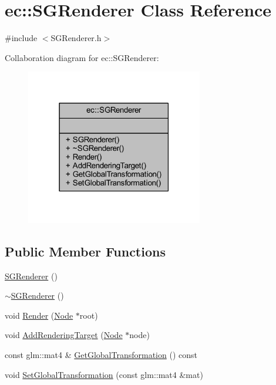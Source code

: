 \hypertarget{classec_1_1_s_g_renderer}{}\section{ec\+:\+:S\+G\+Renderer Class Reference}
\label{classec_1_1_s_g_renderer}


{\ttfamily \#include $<$S\+G\+Renderer.\+h$>$}



Collaboration diagram for ec\+:\+:S\+G\+Renderer\+:
\nopagebreak
\begin{figure}[H]
\begin{center}
\leavevmode
\includegraphics[width=219pt]{classec_1_1_s_g_renderer__coll__graph}
\end{center}
\end{figure}
\subsection*{Public Member Functions}
\begin{DoxyCompactItemize}
\item 
\mbox{\hyperlink{classec_1_1_s_g_renderer_afefd169d09efe9e7439f2003d145310a}{S\+G\+Renderer}} ()
\item 
\mbox{\hyperlink{classec_1_1_s_g_renderer_ad2c81a98020b16c8869a07d94c677a9a}{$\sim$\+S\+G\+Renderer}} ()
\item 
void \mbox{\hyperlink{classec_1_1_s_g_renderer_a5cdbaa090334b75a28a9b13a1978384e}{Render}} (\mbox{\hyperlink{classec_1_1_node}{Node}} $\ast$root)
\item 
void \mbox{\hyperlink{classec_1_1_s_g_renderer_a38d2be7be66322530a9826cdda6527a0}{Add\+Rendering\+Target}} (\mbox{\hyperlink{classec_1_1_node}{Node}} $\ast$node)
\item 
const glm\+::mat4 \& \mbox{\hyperlink{classec_1_1_s_g_renderer_a3bdf58addcc513b55d46ca189346b38a}{Get\+Global\+Transformation}} () const
\item 
void \mbox{\hyperlink{classec_1_1_s_g_renderer_adf1b4f90d296914597dd5f765fa8e9cd}{Set\+Global\+Transformation}} (const glm\+::mat4 \&mat)
\end{DoxyCompactItemize}


